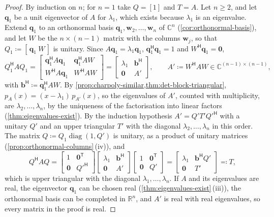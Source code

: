\begin{proof}
By induction on $n$; for $n=1$ take $Q=[1]$ and $T=A$. Let $n\ge2$, and let $\mathbf q_1$ be a unit eigenvector of $A$ for $\lambda_1$, which exists because $\lambda_1$ is an eigenvalue. Extend $\mathbf q_1$ to an orthonormal basis $\mathbf q_1,\mathbf w_2,\ldots,\mathbf w_n$ of $\mathbb C^n$ (\cref{cor:orthonormal-basis}), and let $W$ be the $n\times(n-1)$ matrix with the columns $\mathbf w_j$, so that $Q_1\coloneqq[\,\mathbf q_1\ W\,]$ is unitary. Since $A\mathbf q_1=\lambda_1\mathbf q_1$, $\mathbf q_1^{\mathsf H}\mathbf q_1=1$ and $W^{\mathsf H}\mathbf q_1=\mathbf 0$,
\[
Q_1^{\mathsf H}AQ_1=\begin{bmatrix}\mathbf q_1^{\mathsf H}A\mathbf q_1&\mathbf q_1^{\mathsf H}AW\\W^{\mathsf H}A\mathbf q_1&W^{\mathsf H}AW\end{bmatrix}=\begin{bmatrix}\lambda_1&\mathbf b^{\mathsf H}\\\mathbf 0&A'\end{bmatrix},\qquad A'\coloneqq W^{\mathsf H}AW\in\mathbb C^{(n-1)\times(n-1)},
\]
with $\mathbf b^{\mathsf H}\coloneqq\mathbf q_1^{\mathsf H}AW$. By \cref{prop:charpoly-similar,thm:det-block-triangular}, $p_A(x)=(x-\lambda_1)\,p_{A'}(x)$, so the eigenvalues of $A'$, counted with multiplicity, are $\lambda_2,\ldots,\lambda_n$, by the uniqueness of the factorisation into linear factors (\cref{thm:eigenvalues-exist}). By the induction hypothesis $A'=Q'T'Q'^{\mathsf H}$ with a unitary $Q'$ and an upper triangular $T'$ with the diagonal $\lambda_2,\ldots,\lambda_n$ in this order. The matrix $Q\coloneqq Q_1\operatorname{diag}(1,Q')$ is unitary, as a product of unitary matrices (\cref{prop:orthonormal-columns}\,(iv)), and
\[
Q^{\mathsf H}AQ=\begin{bmatrix}1&\mathbf 0^{\mathsf T}\\\mathbf 0&Q'^{\mathsf H}\end{bmatrix}\begin{bmatrix}\lambda_1&\mathbf b^{\mathsf H}\\\mathbf 0&A'\end{bmatrix}\begin{bmatrix}1&\mathbf 0^{\mathsf T}\\\mathbf 0&Q'\end{bmatrix}=\begin{bmatrix}\lambda_1&\mathbf b^{\mathsf H}Q'\\\mathbf 0&T'\end{bmatrix}\eqqcolon T ,
\]
which is upper triangular with the diagonal $\lambda_1,\ldots,\lambda_n$. If $A$ and its eigenvalues are real, the eigenvector $\mathbf q_1$ can be chosen real (\cref{thm:eigenvalues-exist}\,(iii)), the orthonormal basis can be completed in $\mathbb R^n$, and $A'$ is real with real eigenvalues, so every matrix in the proof is real.
\end{proof}

